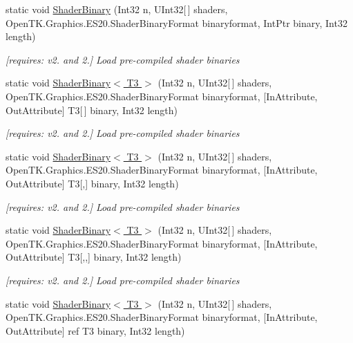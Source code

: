 \begin{DoxyCompactItemize}
static void \hyperlink{class_open_t_k_1_1_graphics_1_1_e_s20_1_1_g_l_a343edeeab20e9c7e1bfd2780b7d9e7a3}{Shader\-Binary} (Int32 n, U\-Int32\mbox{[}$\,$\mbox{]} shaders, Open\-T\-K.\-Graphics.\-E\-S20.\-Shader\-Binary\-Format binaryformat, Int\-Ptr binary, Int32 length)
\begin{DoxyCompactList}\small\item\em \mbox{[}requires\-: v2. and 2.\mbox{]} Load pre-\/compiled shader binaries \end{DoxyCompactList}\item 
static void \hyperlink{class_open_t_k_1_1_graphics_1_1_e_s20_1_1_g_l_a162930ce9aa4f4d561d7a0950ab86897}{Shader\-Binary$<$ T3 $>$} (Int32 n, U\-Int32\mbox{[}$\,$\mbox{]} shaders, Open\-T\-K.\-Graphics.\-E\-S20.\-Shader\-Binary\-Format binaryformat, \mbox{[}In\-Attribute, Out\-Attribute\mbox{]} T3\mbox{[}$\,$\mbox{]} binary, Int32 length)
\begin{DoxyCompactList}\small\item\em \mbox{[}requires\-: v2. and 2.\mbox{]} Load pre-\/compiled shader binaries \end{DoxyCompactList}\item 
static void \hyperlink{class_open_t_k_1_1_graphics_1_1_e_s20_1_1_g_l_ac96a178f95bb69c41638a66f4c11738a}{Shader\-Binary$<$ T3 $>$} (Int32 n, U\-Int32\mbox{[}$\,$\mbox{]} shaders, Open\-T\-K.\-Graphics.\-E\-S20.\-Shader\-Binary\-Format binaryformat, \mbox{[}In\-Attribute, Out\-Attribute\mbox{]} T3\mbox{[},\mbox{]} binary, Int32 length)
\begin{DoxyCompactList}\small\item\em \mbox{[}requires\-: v2. and 2.\mbox{]} Load pre-\/compiled shader binaries \end{DoxyCompactList}\item 
static void \hyperlink{class_open_t_k_1_1_graphics_1_1_e_s20_1_1_g_l_acc50b5745f5e532916f92b45ad64c77a}{Shader\-Binary$<$ T3 $>$} (Int32 n, U\-Int32\mbox{[}$\,$\mbox{]} shaders, Open\-T\-K.\-Graphics.\-E\-S20.\-Shader\-Binary\-Format binaryformat, \mbox{[}In\-Attribute, Out\-Attribute\mbox{]} T3\mbox{[},,\mbox{]} binary, Int32 length)
\begin{DoxyCompactList}\small\item\em \mbox{[}requires\-: v2. and 2.\mbox{]} Load pre-\/compiled shader binaries \end{DoxyCompactList}\item 
static void \hyperlink{class_open_t_k_1_1_graphics_1_1_e_s20_1_1_g_l_a5f50accfacc478cda0d2afa5cd1d9cf7}{Shader\-Binary$<$ T3 $>$} (Int32 n, U\-Int32\mbox{[}$\,$\mbox{]} shaders, Open\-T\-K.\-Graphics.\-E\-S20.\-Shader\-Binary\-Format binaryformat, \mbox{[}In\-Attribute, Out\-Attribute\mbox{]} ref T3 binary, Int32 length)

\end{DoxyCompactItemize}
